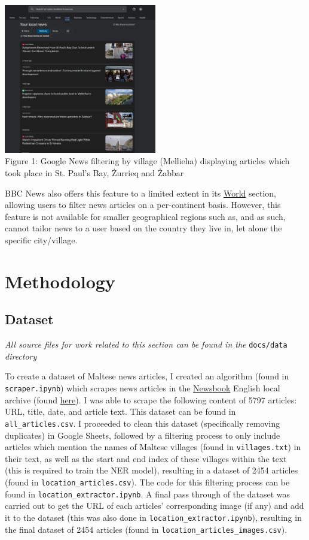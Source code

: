 \documentclass[a4paper, oneside, 11pt]{article}
\begin{document}
\begin{multicols*}{2}
  \begin{center}
    \includegraphics[width=0.5\textwidth]{./figures/googlenewsmellieha.png} \\
    Figure 1: Google News filtering by village (Mellieha) displaying articles which took place in St. Paul's Bay, Żurrieq and Żabbar
  \end{center}
  

  BBC News also offers this feature to a limited extent in its \href{https://www.bbc.com/news/world}{World} section, allowing users to filter news articles on a per-continent basis. However, this feature is not available for smaller geographical regions such as, and as such, cannot tailor news to a user based on the country they live in, let alone the specific city/village.

  
  \section{Methodology}
  \subsection{Dataset}
  \textit{All source files for work related to this section can be found in the} \verb|docs/data| \textit{directory}

  \medskip

  To create a dataset of Maltese news articles, I created an algorithm (found in \verb|scraper.ipynb|) which scrapes news articles in the \href{https://newsbook.com.mt/}{Newsbook} English local archive (found \href{https://newsbook.com.mt/en/category/news/local/}{here}). I was able to scrape the following content of 5797 articles: URL, title, date, and article text. This dataset can be found in \verb|all_articles.csv|. I proceeded to clean this dataset (specifically removing duplicates) in Google Sheets, followed by a filtering process to only include articles which mention the names of Maltese villages (found in \verb|villages.txt|) in their text, as well as the start and end index of these villages within the text (this is required to train the NER model), resulting in a dataset of 2454 articles (found in \verb|location_articles.csv|). The code for this filtering process can be found in \verb|location_extractor.ipynb|. A final pass through of the dataset was carried out to get the URL of each articles' corresponding image (if any) and add it to the dataset (this was also done in \verb|location_extractor.ipynb|), resulting in the final dataset of 2454 articles (found in \verb|location_articles_images.csv|).


\end{multicols*}
\end{document}
